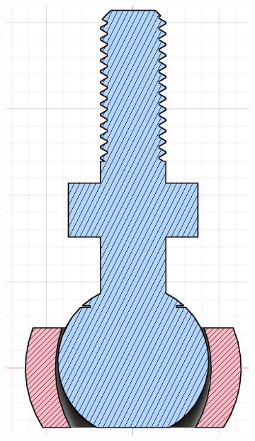 \documentclass[a4paper, 10pt]{article}
\begin{document}
		\begin{figure}[h]
			\centering
			\begin{subfigure}[h]{0.34\textwidth}
				\centering
				\includegraphics[width=\textwidth]{Photos/section_ball_joint}
			\end{subfigure}
			\hfill
			\begin{subfigure}[h]{0.65\textwidth}
				\centering

\end{subfigure}
\end{figure}
\end{document}
